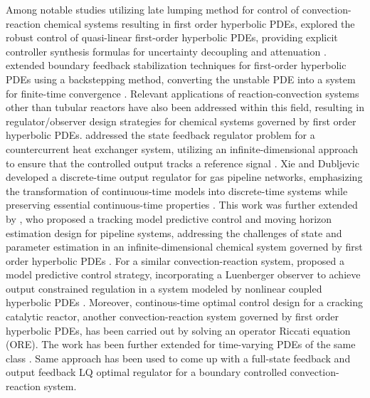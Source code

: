 Among notable studies utilizing late lumping method for control of convection-reaction chemical systems resulting in first order hyperbolic PDEs,  explored the robust control of quasi-linear first-order hyperbolic PDEs, providing explicit controller synthesis formulas for uncertainty decoupling and attenuation \autocite{christofides1998robust}.  extended boundary feedback stabilization techniques for first-order hyperbolic PDEs using a backstepping method, converting the unstable PDE into a system for finite-time convergence \autocite{krstic2008backstepping}. Relevant applications of reaction-convection systems other than tubular reactors have also been addressed within this field, resulting in regulator/observer design strategies for chemical systems governed by first order hyperbolic PDEs.  addressed the state feedback regulator problem for a countercurrent heat exchanger system, utilizing an infinite-dimensional approach to ensure that the controlled output tracks a reference signal \autocite{xu2016state}. Xie and Dubljevic  developed a discrete-time output regulator for gas pipeline networks, emphasizing the transformation of continuous-time models into discrete-time systems while preserving essential continuous-time properties \autocite{xie2021discrete}. This work was further extended by , who proposed a tracking model predictive control and moving horizon estimation design for pipeline systems, addressing the challenges of state and parameter estimation in an infinite-dimensional chemical system governed by first order hyperbolic PDEs \autocite{zhang2023tracking}. For a similar convection-reaction system,  proposed a model predictive control strategy, incorporating a Luenberger observer to achieve output constrained regulation in a system modeled by nonlinear coupled hyperbolic PDEs \autocite{zhang2022dynamic}. Moreover, continous-time optimal control design for a cracking catalytic reactor, another convection-reaction system governed by first order hyperbolic PDEs, has been carried out by solving an operator Riccati equation (ORE)\autocite{aksikas2009lq}. The work has been further extended for time-varying PDEs of the same class \autocite{aksikas2013optimal}. Same approach has been used to come up with a full-state feedback \autocite{mohammadi2012lq} and output feedback \autocite{aksikas2024spectral} LQ optimal regulator for a boundary controlled convection-reaction system.

